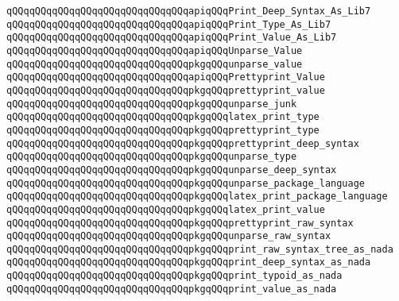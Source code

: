 \verb|qQQqqQQqqQQqqQQqqQQqqQQqqQQqqQQqapiqQQqPrint_Deep_Syntax_As_Lib7|\newline
\verb|qQQqqQQqqQQqqQQqqQQqqQQqqQQqqQQqapiqQQqPrint_Type_As_Lib7|\newline
\verb|qQQqqQQqqQQqqQQqqQQqqQQqqQQqqQQqapiqQQqPrint_Value_As_Lib7|\newline
\newline
\verb|qQQqqQQqqQQqqQQqqQQqqQQqqQQqqQQqapiqQQqUnparse_Value|\newline
\verb|qQQqqQQqqQQqqQQqqQQqqQQqqQQqqQQqpkgqQQqunparse_value|\newline
\newline
\verb|qQQqqQQqqQQqqQQqqQQqqQQqqQQqqQQqapiqQQqPrettyprint_Value|\newline
\verb|qQQqqQQqqQQqqQQqqQQqqQQqqQQqqQQqpkgqQQqprettyprint_value|\newline
\newline
\verb|qQQqqQQqqQQqqQQqqQQqqQQqqQQqqQQqpkgqQQqunparse_junk|\newline
\verb|qQQqqQQqqQQqqQQqqQQqqQQqqQQqqQQqpkgqQQqlatex_print_type|\newline
\verb|qQQqqQQqqQQqqQQqqQQqqQQqqQQqqQQqpkgqQQqprettyprint_type|\newline
\verb|qQQqqQQqqQQqqQQqqQQqqQQqqQQqqQQqpkgqQQqprettyprint_deep_syntax|\newline
\verb|qQQqqQQqqQQqqQQqqQQqqQQqqQQqqQQqpkgqQQqunparse_type|\newline
\verb|qQQqqQQqqQQqqQQqqQQqqQQqqQQqqQQqpkgqQQqunparse_deep_syntax|\newline
\verb|qQQqqQQqqQQqqQQqqQQqqQQqqQQqqQQqpkgqQQqunparse_package_language|\newline
\verb|qQQqqQQqqQQqqQQqqQQqqQQqqQQqqQQqpkgqQQqlatex_print_package_language|\newline
\verb|qQQqqQQqqQQqqQQqqQQqqQQqqQQqqQQqpkgqQQqlatex_print_value|\newline
\verb|qQQqqQQqqQQqqQQqqQQqqQQqqQQqqQQqpkgqQQqprettyprint_raw_syntax|\newline
\verb|qQQqqQQqqQQqqQQqqQQqqQQqqQQqqQQqpkgqQQqunparse_raw_syntax|\newline
\verb|qQQqqQQqqQQqqQQqqQQqqQQqqQQqqQQqpkgqQQqprint_raw_syntax_tree_as_nada|\newline
\verb|qQQqqQQqqQQqqQQqqQQqqQQqqQQqqQQqpkgqQQqprint_deep_syntax_as_nada|\newline
\verb|qQQqqQQqqQQqqQQqqQQqqQQqqQQqqQQqpkgqQQqprint_typoid_as_nada|\newline
\verb|qQQqqQQqqQQqqQQqqQQqqQQqqQQqqQQqpkgqQQqprint_value_as_nada|\newline
